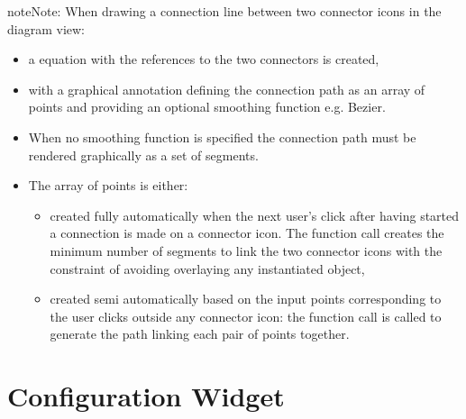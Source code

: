 \documentclass[letterpaper,10pt, openany,english]{sphinxmanual}
\begin{document}
\begin{sphinxadmonition}{note}{Note:}
When drawing a connection line between two connector icons in the diagram view:
\begin{itemize}
\item {} 
a  equation with the references to the two connectors is created,

\item {} 
with a graphical annotation defining the connection path as an array of points and providing an optional smoothing function e.g. Bezier.

\item {} 
When no smoothing function is specified the connection path must be rendered graphically as a set of segments.

\item {} 
The array of points is either:
\begin{itemize}
\item {} 
created fully automatically when the next user’s click after having started a connection is made on a connector icon. The function call  creates the minimum number of  segments to link the two connector icons with the constraint of avoiding overlaying any instantiated object,

\item {} 
created semi automatically based on the input points corresponding to the user clicks outside any connector icon: the function call  is called to generate the path linking each pair of points together.

\end{itemize}

\end{itemize}
\end{sphinxadmonition}


\section{Configuration Widget}
\label{\detokenize{requirements:configuration-widget}}\label{\detokenize{requirements:par-configuration-widget}}
\end{document}
